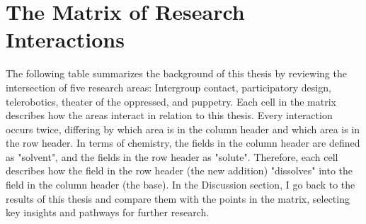 \documentclass[dissertation,math,vertlayout,pdfa,colorlinks]{aaltoseries}
\begin{document}
\section{The Matrix of Research Interactions}
\label{sec:matrix_of_intersections}
The following table summarizes the background of this thesis by reviewing the intersection of five research areas: Intergroup contact, participatory design, telerobotics, theater of the oppressed, and puppetry. Each cell in the matrix describes how the areas interact in relation to this thesis. Every interaction occurs twice, differing by which area is in the column header and which area is in the row header. In terms of chemistry, the fields in the column header are defined as "solvent", and the fields in the row header as "solute". Therefore, each cell describes how the field in the row header (the new addition) "dissolves" into the field in the column header (the base). In the Discussion section, I go back to the results of this thesis and compare them with the points in the matrix, selecting key insights and pathways for further research.


\end{document}
